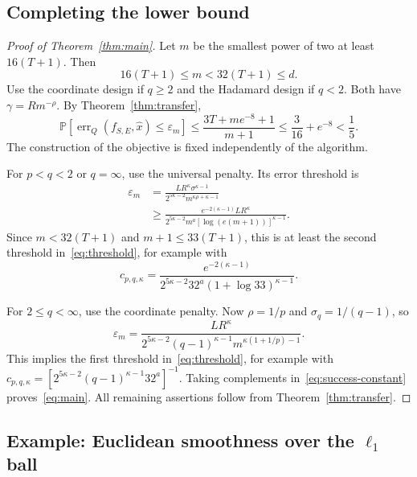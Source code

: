 \documentclass[11pt,a4paper]{article}
\theoremstyle{definition}
\theoremstyle{remark}
\newcommand{\Prb}{\mathbb P}
\newcommand{\eps}{\varepsilon}
\DeclareMathOperator{\err}{err}
\begin{document}
\subsection{Completing the lower bound}

\begin{proof}[Proof of Theorem~\ref{thm:main}]
Let $m$ be the smallest power of two at least $16(T+1)$. Then
\begin{equation}\label{eq:dimension}
   16(T+1)\le m<32(T+1)\le d.
\end{equation}
Use the coordinate design if $q\ge2$ and the Hadamard design if $q<2$.
Both have $\gamma=Rm^{-\rho}$.
By Theorem~\ref{thm:transfer},
\begin{equation}\label{eq:success-constant}
 \Prb[\err_Q(f_{S,E},\widehat x)\le\eps_m]
 \le\frac{3T+me^{-8}+1}{m+1}
 \le\frac3{16}+e^{-8}<\frac15.
\end{equation}
The construction of the objective is fixed independently of the algorithm.

For $p<q<2$ or $q=\infty$, use the universal penalty. Its error threshold is
\begin{align}
 \eps_m
 &=\frac{LR^\kappa\sigma^{\kappa-1}}
          {2^{5\kappa-2}m^{\kappa\rho+\kappa-1}}
   \label{eq:exactrate}\\
 &\ge\frac{e^{-2(\kappa-1)}LR^\kappa}
 {2^{5\kappa-2}m^a[\log(e(m+1))]^{\kappa-1}}.\nonumber
\end{align}
Since $m<32(T+1)$ and $m+1\le33(T+1)$, this is at least the second
threshold in~\eqref{eq:threshold}, for example with
\[
 c_{p,q,\kappa}
 =\frac{e^{-2(\kappa-1)}}
 {2^{5\kappa-2}32^a(1+\log33)^{\kappa-1}}.
\]

For $2\le q<\infty$, use the coordinate penalty. Now $\rho=1/p$ and
$\sigma_q=1/(q-1)$, so
\begin{equation}\label{eq:finiteq-rate}
 \eps_m=
 \frac{LR^\kappa}
 {2^{5\kappa-2}(q-1)^{\kappa-1}m^{\kappa(1+1/p)-1}}.
\end{equation}
This implies the first threshold in~\eqref{eq:threshold}, for example with
$c_{p,q,\kappa}=[2^{5\kappa-2}(q-1)^{\kappa-1}32^a]^{-1}$.
Taking complements in~\eqref{eq:success-constant} proves~\eqref{eq:main}.
All remaining assertions follow from Theorem~\ref{thm:transfer}.
\end{proof}

\subsection{Example: Euclidean smoothness over the \texorpdfstring{$\ell_1$}{l1} ball}
\end{document}
